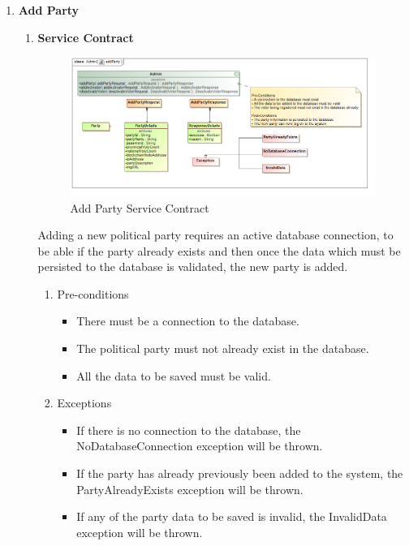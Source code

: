 \begin{enumerate}
\begin{enumerate}
		\end{enumerate}
		
		\newpage
		
		\item \textbf{Add Party}
		\begin{enumerate}
			\item \textbf{Service Contract}
			\begin{figure}[H]
				\centering
				\includegraphics[width=0.75\linewidth]{../Images/Admin/ServiceContracts/addParty_ServiceContract.png}
				\caption{Add Party Service Contract}
			\end{figure}
			
		Adding a new political party requires an active database connection, to be able if the party already exists and then once the data which must be persisted to the database is validated, the new party is added. 
			\newline	
			
			\begin{enumerate}
				\item Pre-conditions
				\begin{itemize}
					\item There must be a connection to the database.
					\item The  political party must not already exist in the database.
					\item All the data to be saved must be valid.
				\end{itemize}
				
				\item Exceptions
				\begin{itemize}
					\item If there is no connection to the database, the NoDatabaseConnection exception will be thrown.
					\item If the party has already previously been added to the system, the PartyAlreadyExists exception will be thrown.
					\item If any of the party data to be saved is invalid, the InvalidData exception will be thrown.
				\end{itemize}
				

\end{enumerate}
\end{enumerate}
\end{enumerate}
